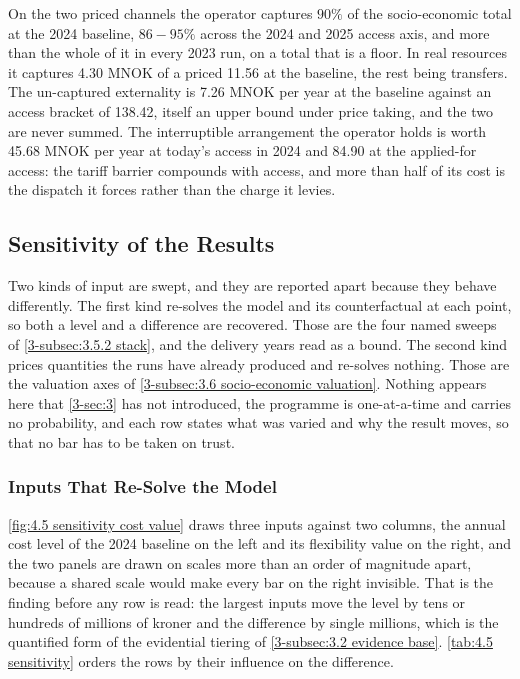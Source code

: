\begin{keypoint}
On the two priced channels the operator captures $90\%$ of the socio-economic total at the 2024 baseline, $86 - 95\%$ across the 2024 and 2025 access axis, and more than the whole of it in every 2023 run, on a total that is a floor. In real resources it captures 4.30 MNOK of a priced 11.56 at the baseline, the rest being transfers. The un-captured externality is 7.26 MNOK per year at the baseline against an access bracket of 138.42, itself an upper bound under price taking, and the two are never summed. The interruptible arrangement the operator holds is worth 45.68 MNOK per year at today's access in 2024 and 84.90 at the applied-for access: the tariff barrier compounds with access, and more than half of its cost is the dispatch it forces rather than the charge it levies.
\end{keypoint}

\subsection{Sensitivity of the Results}
\label{4-subsec:4.1.4 sensitivity analysis}

Two kinds of input are swept, and they are reported apart because they behave differently. The first kind re-solves the model and its counterfactual at each point, so both a level and a difference are recovered. Those are the four named sweeps of \autoref{3-subsec:3.5.2 stack}, and the delivery years read as a bound. The second kind prices quantities the runs have already produced and re-solves nothing. Those are the valuation axes of \autoref{3-subsec:3.6 socio-economic valuation}. Nothing appears here that \autoref{3-sec:3} has not introduced, the programme is one-at-a-time and carries no probability, and each row states what was varied and why the result moves, so that no bar has to be taken on trust.

\subsubsection{Inputs That Re-Solve the Model}
\label{4-subsec:4.4.1 lp sensitivities}

\autoref{fig:4.5 sensitivity cost value} draws three inputs against two columns, the annual cost level of the 2024 baseline on the left and its flexibility value on the right, and the two panels are drawn on scales more than an order of magnitude apart, because a shared scale would make every bar on the right invisible. That is the finding before any row is read: the largest inputs move the level by tens or hundreds of millions of kroner and the difference by single millions, which is the quantified form of the evidential tiering of \autoref{3-subsec:3.2 evidence base}. \autoref{tab:4.5 sensitivity} orders the rows by their influence on the difference.


